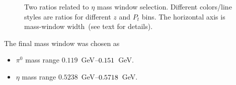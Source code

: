 \begin{figure}[h]
\centering     %
{}
\caption{Two ratios related to $\eta$ mass window selection. Different colors/line styles are ratios for different $z$ and $P_t$ bins. The horizontal axis is mass-window width~(see text for details).}
\label{fig:etaS}
\end{figure}
The final mass window was chosen as
\begin{itemize}
\item $\pi^0$ mass range $0.119$~GeV$\textup{--}0.151$~GeV.
\item $\eta$ mass range $0.5238$~GeV$\textup{--}0.5718$~GeV.
\end{itemize}

